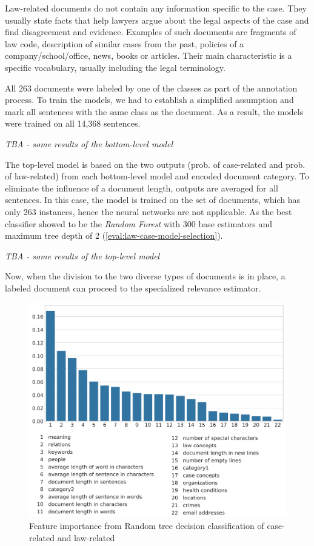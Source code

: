 \documentclass[
  digital, %
  table,   %
  lof,     %
  lot,     %
]{fithesis3}
\begin{document}
Law-related documents do not contain any information specific to the case.
They usually state facts that help lawyers argue about the legal aspects of the case and find disagreement and evidence.
Examples of such documents are fragments of law code, description of similar cases from the past, policies of a company/school/office, news, books or articles.
Their main characteristic is a specific vocabulary, usually including the legal terminology.

All 263 documents were labeled by one of the classes as part of the annotation process.
To train the models, we had to establish a simplified assumption and mark all sentences with the same class as the document.
As a result, the models were trained on all 14,368 sentences.

\textit{TBA - some results of the bottom-level model}

The top-level model is based on the two outputs (prob. of case-related and prob. of law-related) from each bottom-level model and encoded document category.
To eliminate the influence of a document length, outputs are averaged for all sentences.
In this case, the model is trained on the set of documents, which has only 263 instances, hence the neural networks are not applicable.
As the best classifier showed to be the \textit{Random Forest} with 300 base estimators and maximum tree depth of 2 (\ref{eval:law-case-model-selection}).

\textit{TBA - some results of the top-level model}

Now, when the division to the two diverse types of documents is in place, a labeled document can proceed to the specialized relevance estimator.

\begin{figure}[H]
\caption{Feature importance from Random tree decision classification of case-related and law-related}
\label{fig:case_law_feature_importance}
\includegraphics[width=\textwidth]{img/case_law_feature_importance}
\end{figure}
\end{document}
